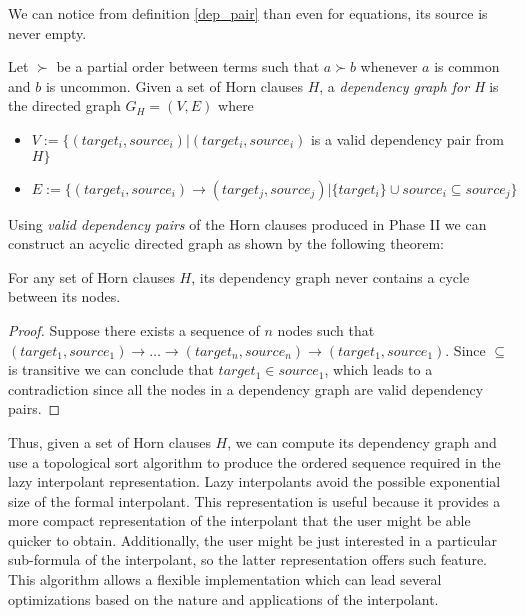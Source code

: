 We can notice from definition \ref{dep_pair} than even for 
equations, its source is never empty. 

\begin{definition}\label{dep_graph}
  Let $\succ$ be a partial order between terms 
  such that $a \succ b$ whenever 
  $a$ is common and $b$ is uncommon. Given a set of 
  Horn clauses $H$, a \emph{dependency graph for H}
  is the directed graph $G_H = (V, E)$ where
  \begin{itemize}
    \item $V := \{(target_i, source_i) | (target_i, source_i)$ 
      is a valid dependency pair from $H \}$
    \item $E := \{(target_i, source_i) \rightarrow (target_j, source_j) | 
        \{target_i\} \cup source_i \subseteq source_j
      \}$ 
  \end{itemize}
\end{definition}

Using \emph{valid dependency pairs} of the Horn clauses 
produced in Phase II
we can construct an acyclic directed graph as shown 
by the following theorem:

\begin{theorem}
  For any set of Horn clauses $H$, its dependency graph 
  never contains a cycle between its nodes.
\end{theorem}

\begin{proof}
  Suppose there exists a sequence of $n$ nodes such that 
  $(target_1, source_1) \rightarrow \dots 
  \rightarrow (target_n, source_n) \rightarrow (target_1, source_1)$.
  Since $\subseteq$ is transitive we can conclude that 
  $target_1 \in source_1$, which leads to a contradiction since all
  the nodes in a dependency graph are valid dependency pairs.
\end{proof}

Thus, given a set of Horn clauses $H$, we can compute its
dependency graph and use a topological sort algorithm to 
produce the ordered sequence required in the lazy interpolant
representation. Lazy interpolants avoid the 
possible exponential size of the 
formal interpolant. This representation 
is useful because it provides a more compact
representation of the interpolant that the user 
might be able quicker to obtain.
Additionally, the user might be just 
interested in a particular sub-formula of 
the interpolant, so the
latter representation offers such feature. This algorithm 
allows a flexible implementation 
which can lead several optimizations
based on the nature and applications of the 
interpolant.

